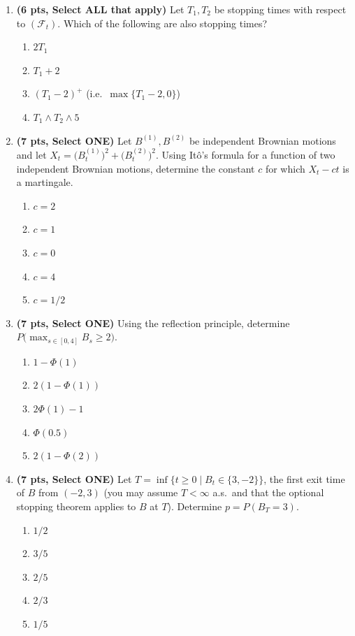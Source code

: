 \documentclass[11pt]{article}
\begin{document}
\begin{enumerate}

\item[\textbf{Q1.}] \textbf{(6 pts, Select ALL that apply)} Let $T_1,T_2$ be stopping times with respect to $(\mathcal F_t)$. Which of the following are also stopping times?
\begin{enumerate}
  \item $2T_1$
  \item $T_1+2$
  \item $(T_1-2)^+$ (i.e.\ $\max\{T_1-2,0\}$)
  \item $T_1\wedge T_2\wedge 5$
\end{enumerate}

\item[\textbf{Q2.}] \textbf{(7 pts, Select ONE)} Let $B^{(1)},B^{(2)}$ be independent Brownian motions and let $X_t=\big(B^{(1)}_t\big)^2+\big(B^{(2)}_t\big)^2$. Using It\^o's formula for a function of two independent Brownian motions, determine the constant $c$ for which $X_t-ct$ is a martingale.
\begin{enumerate}
  \item $c=2$
  \item $c=1$
  \item $c=0$
  \item $c=4$
  \item $c=1/2$
\end{enumerate}

\item[\textbf{Q3.}] \textbf{(7 pts, Select ONE)} Using the reflection principle, determine $P\big(\max_{s\in[0,4]}B_s\ge2\big)$.
\begin{enumerate}
  \item $1-\Phi(1)$
  \item $2(1-\Phi(1))$
  \item $2\Phi(1)-1$
  \item $\Phi(0.5)$
  \item $2(1-\Phi(2))$
\end{enumerate}

\item[\textbf{Q4.}] \textbf{(7 pts, Select ONE)} Let $T=\inf\{t\ge0\mid B_t\in\{3,-2\}\}$, the first exit time of $B$ from $(-2,3)$ (you may assume $T<\infty$ a.s.\ and that the optional stopping theorem applies to $B$ at $T$). Determine $p=P(B_T=3)$.
\begin{enumerate}
  \item $1/2$
  \item $3/5$
  \item $2/5$
  \item $2/3$
  \item $1/5$
\end{enumerate}


\end{enumerate}
\end{document}
